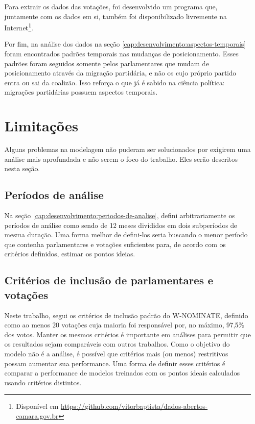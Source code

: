 \documentclass[a4paper,titlepage]{ppgi}\usepackage[]{graphicx}\usepackage[]{color}
\begin{document}
Para extrair os dados das votações, foi desenvolvido um programa que,
juntamente com os dados em si, também foi disponibilizado livremente na
Internet\footnote{Disponível em
\url{https://github.com/vitorbaptista/dados-abertos-camara.gov.br}}.

Por fim, na análise dos dados na seção
\ref{cap:desenvolvimento:aspectos-temporais} foram encontrados padrões
temporais nas mudanças de posicionamento. Esses padrões foram seguidos somente
pelos parlamentares que mudam de posicionamento através da migração partidária,
e não os cujo próprio partido entra ou sai da coalizão. Isso reforça o que já
é sabido na ciência política: migrações partidárias possuem aspectos temporais.

\section{Limitações}
\label{cap:conclusao:limitacoes}

Alguns problemas na modelagem não puderam ser solucionados por exigirem uma
análise mais aprofundada e não serem o foco do trabalho. Eles serão descritos
nesta seção.

\subsection{Períodos de análise}

Na seção \ref{cap:desenvolvimento:periodos-de-analise}, defini arbitrariamente
os períodos de análise como sendo de 12 meses divididos em dois subperíodos de
mesma duração. Uma forma melhor de defini-los seria buscando o menor período
que contenha parlamentares e votações suficientes para, de acordo com os
critérios definidos, estimar os pontos ideias.

\subsection{Critérios de inclusão de parlamentares e votações}

Neste trabalho, segui os critérios de inclusão padrão do W-NOMINATE, definido
como ao menos 20 votações cuja maioria foi responsável por, no máximo, 97,5\%
dos votos. Manter os mesmos critérios é importante em análises para permitir
que os resultados sejam comparáveis com outros trabalhos. Como o objetivo do
modelo não é a análise, é possível que critérios mais (ou menos) restritivos
possam aumentar sua performance. Uma forma de definir esses critérios é
comparar a performance de modelos treinados com os pontos ideais calculados
usando critérios distintos.
\end{document}
